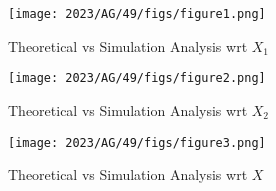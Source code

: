 \documentclass[journal,12pt,twocolumn]{IEEEtran}
\theoremstyle{remark}
\begin{document}
\begin{figure}[!ht]
\centering
\texttt{[image: 2023/AG/49/figs/figure1.png]}
\caption{Theoretical vs Simulation Analysis wrt $X_1$ }
\label{Fig:2023/AG/49/4}
\end{figure}
\begin{figure}[!ht]
\centering
\texttt{[image: 2023/AG/49/figs/figure2.png]}
\caption{Theoretical vs Simulation Analysis wrt $X_2$ }
\label{Fig:2023/AG/49/5}
\end{figure}
\begin{figure}[!ht]
\centering
\texttt{[image: 2023/AG/49/figs/figure3.png]}
\caption{Theoretical vs Simulation Analysis wrt $X$ }
\label{Fig:2023/AG/49/6}
\end{figure}
\end{document}

